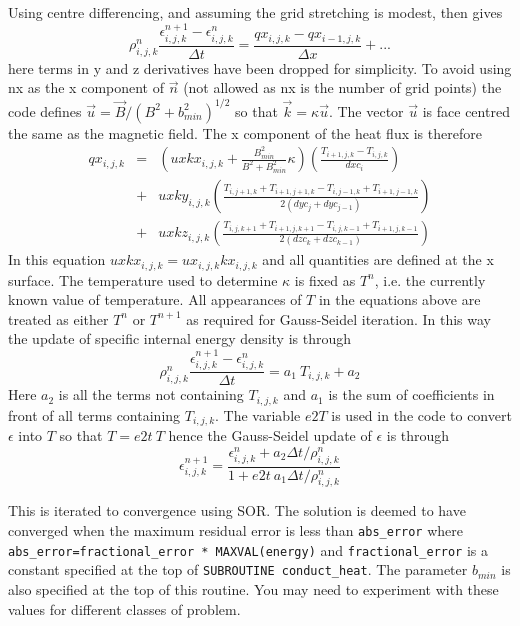 \documentclass[11pt]{article}
\begin{document}
Using centre differencing, and assuming the grid stretching is modest,  then gives
\[
\rho_{i,j,k}^n \frac{\epsilon_{i,j,k}^{n+1}- \epsilon_{i,j,k}^{n}}{\Delta t}  =  
\frac{qx_{i,j,k}- qx_{i-1,j,k}}{\Delta x} + ...
\]      
here terms in y and z derivatives have been dropped for simplicity. To avoid using nx as the x component of $\vec{n}$ (not allowed as nx is the number of grid points) the code defines $\vec{u}=\vec{B}/(B^2+b_{min}^2)^{1/2}$ so that $\vec{k} = \kappa \vec{u}$. The vector $\vec{u}$ is face centred the same as the magnetic field. The x component of the heat flux is therefore
\begin{eqnarray*}
qx_{i,j,k}&=&\left(uxkx_{i,j,k} + \frac{B_{min}^2}{B^2+B_{min}^2}\kappa \right)\left(\frac{T_{i+1,j,k}-T_{i,j,k}}{dxc_i} 
    \right) \\
    &+& uxky_{i,j,k}\left(\frac{T_{i,j+1,k}+T_{i+1,j+1,k}-T_{i,j-1,k}+T_{i+1,j-1,k}}{2(dyc_j+dyc_{j-1})} \right) \\
    &+& uxkz_{i,j,k}\left(\frac{T_{i,j,k+1}+T_{i+1,j,k+1}-T_{i,j,k-1}+T_{i+1,j,k-1}}{2(dzc_k+dzc_{k-1})} \right)
\end{eqnarray*}
In this equation $uxkx_{i,j,k}=ux_{i,j,k}kx_{i,j,k}$ and all quantities are defined at the x surface. The temperature used to determine $\kappa$ is fixed as $T^n$, i.e. the currently known value of temperature. All appearances of $T$ in the equations above are treated as either $T^n$ or $T^{n+1}$ as required for Gauss-Seidel iteration. In this way the update of specific internal energy density is through
\[
\rho_{i,j,k}^n \frac{\epsilon_{i,j,k}^{n+1}- \epsilon_{i,j,k}^{n}}{\Delta t}  =  a_1\ T_{i,j,k} + a_2
\]
Here $a_2$ is all the terms not containing $T_{i,j,k}$ and $a_1$ is the sum of coefficients in front of all terms containing 
$T_{i,j,k}$.
The variable $e2T$ is used in the code to convert $\epsilon$ into $T$ so that $T=e2t \ T$ hence the Gauss-Seidel update of $\epsilon$ is through
\[
\epsilon_{i,j,k}^{n+1}=\frac{\epsilon_{i,j,k}^{n} + a_2 \Delta t /\rho_{i,j,k}^n}{1+e2t\ a_1 \Delta t /\rho_{i,j,k}^n}
\]

This is iterated to convergence using SOR. The solution is deemed to have converged when the maximum residual error is less than \texttt{abs\_error} where \texttt{abs\_error=fractional\_error * MAXVAL(energy)} and \texttt{fractional\_error} is a constant specified at the top of {\tt SUBROUTINE conduct\_heat}. The parameter $b_{min}$ is also specified at the top of this routine. You may need to experiment with these values for different classes of problem.
\end{document}
